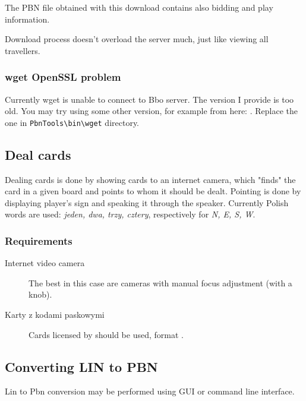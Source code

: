\documentclass[polish,a4paper,11pt,oneside]{article}
\begin{document}
The PBN file obtained with this download contains also bidding and play
information.

Download process doesn't overload the server much, just like viewing
all travellers.

\subsubsection{wget OpenSSL problem}
Currently wget is unable to connect to Bbo server.
The version I provide is too old.
You may try using some other version, for example from here:
 .
Replace the one in \verb!PbnTools\bin\wget! directory.


\subsection{Deal cards} \label{rozdaj}

Dealing cards is done by showing cards to an internet camera,
which "finds" the card in a given board and points to whom it should be dealt.
Pointing is done by displaying player's sign and speaking it through the speaker.
Currently Polish words are used: {\em jeden, dwa, trzy, cztery},
respectively for {\em N, E, S, W}. %

\subsubsection{Requirements}
\begin{description}
\item[Internet video camera]
  The best in this case are cameras with manual focus adjustment (with a knob).
  
\item[Karty z kodami paskowymi]
  Cards licensed by 
  should be used, format .
\end{description}

\subsection{Converting LIN to PBN}

Lin to Pbn conversion may be performed using GUI or command line
interface.
\end{document}
